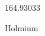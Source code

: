 \documentclass[12pt]{article}
\begin{document}
\hfill{}
\vfill
\begin{center}
  {\fontsize{50}{60}
  }

  164.93033

Holmium
\end{center}
\vfill
\end{document}
